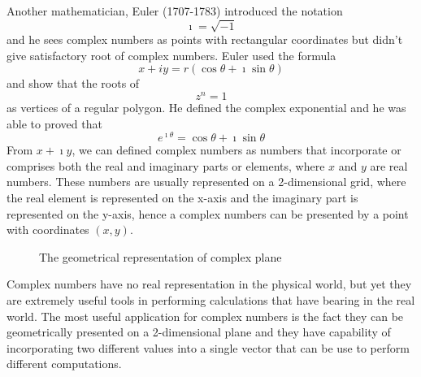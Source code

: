 \documentclass[11pt]{report}
\newcommand{\NI}{\noindent}
\newcommand{\real}{ \mathbb{R}}
\newcommand{\imaginary}{\imath}
\begin{document}
	\NI Another mathematician, Euler (1707-1783) introduced the notation 
	\begin{equation}
		\imaginary = \sqrt{-1}\label{eq:1_7}
	\end{equation}
	 and he sees complex numbers as points with rectangular coordinates but didn't give satisfactory root of complex numbers. Euler used the formula
	\begin{equation}
		x+iy= r(\cos\theta + \imaginary\sin\theta)\label{eq:1_8}
	\end{equation}
	and show that the roots of 
	\begin{equation}
		z^n=1\label{eq:1_9}
	\end{equation}
	as vertices of a regular polygon. He defined the complex exponential and he was able to proved that 
	\begin{equation}
		e^{\imaginary\theta} = \cos\theta + \imaginary\sin\theta\label{eq:1_10}
	\end{equation}
	From $x+\imaginary y$, we can defined complex numbers as numbers that incorporate or comprises both the real and imaginary parts or elements, where $x$ and $y$ are real numbers. These numbers are usually represented on a 2-dimensional grid, where the real element is represented on the x-axis and the imaginary part is represented on the y-axis, hence a complex numbers can be presented by a point with coordinates $(x,y)$.
	
	\begin{figure}[!h]
		\centering
		\caption{The geometrical representation of complex plane}\label{fig:1_1}
	\end{figure}
	Complex numbers have no real representation in the physical world, but yet they are extremely useful tools in performing calculations that have bearing in the real world. The most useful application for complex numbers is the fact they can be geometrically presented on a 2-dimensional plane and they have capability of incorporating two different values into a single vector that can be use to perform different computations.\\
	
\end{document}
